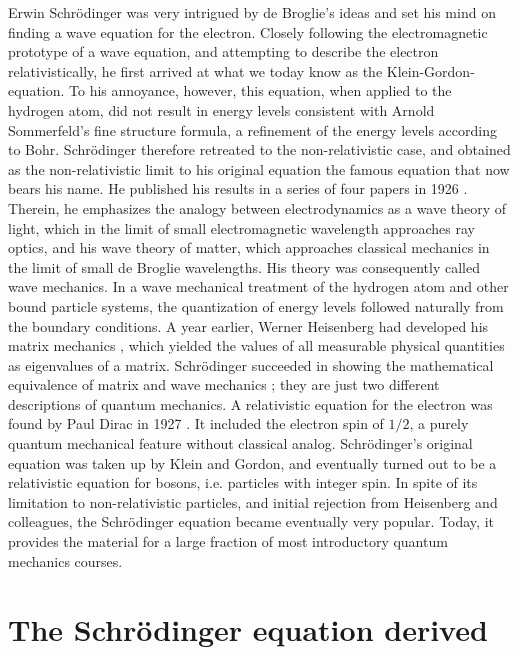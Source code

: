 \documentclass[preprint,footinbib,preprintnumbers,amsmath,amssymb,prb,12pt]{revtex4}
\begin{document}
Erwin Schr\"{o}dinger was very intrigued by de Broglie's ideas and set
his mind on finding a wave equation for the electron. Closely
following the electromagnetic prototype of a wave equation, and
attempting to describe the electron relativistically, he
first arrived at what we today know as the Klein-Gordon-equation. To
his annoyance, however, this equation, when applied to the hydrogen
atom, did not result in energy levels consistent with Arnold
Sommerfeld's fine structure formula, a refinement of the energy
levels according to Bohr. Schr\"{o}dinger therefore retreated to the
non-relativistic case, and obtained as the non-relativistic limit to
his original equation the famous equation that now bears his name.
He published his results in a series of four papers in 1926 \cite{schroedinger1,schroedinger2,schroedinger3,schroedinger4}.
Therein, he emphasizes the analogy between electrodynamics as a wave
theory of light, which in the limit of small electromagnetic wavelength approaches
ray optics, and his wave theory of matter, which
approaches classical mechanics in the limit of small de Broglie
wavelengths. His theory was consequently called wave mechanics. In a
wave mechanical treatment of the hydrogen atom and other bound
particle systems, the quantization of energy levels followed
naturally from the boundary conditions. A year earlier, Werner
Heisenberg had developed his matrix mechanics \cite{heisenberg}, which yielded the values of all
measurable physical quantities as eigenvalues of a
matrix. Schr\"{o}dinger succeeded in showing the mathematical
equivalence of matrix and wave mechanics \cite{schroedinger5}; they
are just two different descriptions of quantum mechanics. A
relativistic equation for the electron was found by Paul Dirac in
1927 \cite{dirac}. It included the electron spin of $1/2$, a purely
quantum mechanical feature without classical analog. Schr\"{o}dinger's
original equation was taken up by Klein and Gordon, and eventually
turned out to be a relativistic equation for bosons, i.e. particles
with integer spin. In spite of its limitation to non-relativistic
particles, and initial rejection from Heisenberg and colleagues, the
Schr\"{o}dinger equation became eventually very popular. Today, it
provides the material for a large fraction of most introductory
quantum mechanics courses.

\section{The Schr\"{o}dinger equation derived}
\end{document}
